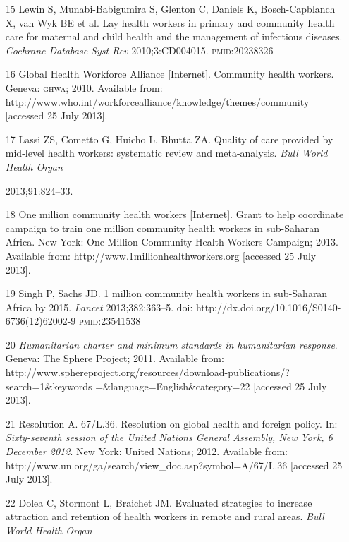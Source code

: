 \documentclass{article}
\begin{document}
\begin{itemize}
\item[15] Lewin S, Munabi-Babigumira S, Glenton C, Daniels K, Bosch-Capblanch X,
van Wyk BE et
al. Lay health workers in primary and community health care for maternal and
child health and the
management of infectious diseases. \textit{Cochrane Database Syst Rev}
2010;3:CD004015.
\textsc{pmid}:20238326

\item[16] Global Health Workforce Alliance [Internet]. Community health workers.
Geneva: \textsc{ghwa};
2010. Available from:
http://www.who.int/workforcealliance/knowledge/themes/community [accessed 25
July 2013].

\item[17] Lassi ZS, Cometto G, Huicho L, Bhutta ZA. Quality of care provided by
mid-level
health workers: systematic review and meta-analysis. \textit{Bull World Health
Organ}

2013;91:824–33.

\item[18] One million community health workers [Internet]. Grant to help
coordinate campaign
to train one million community health workers in sub-Saharan Africa. New York:
One Million Community
Health Workers Campaign; 2013. Available from:
http://www.1millionhealthworkers.org [accessed 25
July 2013].

\item[19] Singh P, Sachs JD. 1 million community health workers in sub-Saharan
Africa by 2015.
\textit{Lancet}
2013;382:363–5. doi: http://dx.doi.org/10.1016/S0140-6736(12)62002-9
\textsc{pmid}:23541538

\item[20] \textit{Humanitarian charter and minimum standards in humanitarian
response}. Geneva: The Sphere Project; 2011. Available from:
http://www.sphereproject.org/resources/download-publications/?search=1\&keywords
=\&language=English\&category=22
[accessed 25 July 2013].

\item[21] Resolution A. 67/L.36. Resolution on global health and foreign policy.
In:
\textit{Sixty-seventh session of the United Nations General Assembly, New York,
6 December
2012}. New York: United Nations; 2012. Available from:
http://www.un.org/ga/search/view\_{}doc.asp?symbol=A/67/L.36 [accessed 25 July
2013].

\item[22] Dolea C, Stormont L, Braichet JM. Evaluated strategies to increase
attraction and
retention of health workers in remote and rural areas. \textit{Bull World Health
Organ}


\end{itemize}
\end{document}
